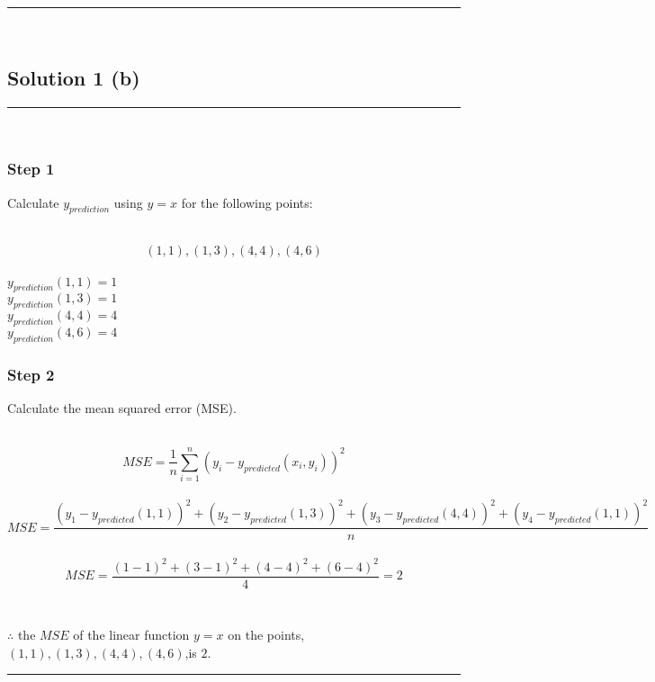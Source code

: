 \documentclass{article}
\begin{document}
\noindent\rule{\textwidth}{0.4pt}\\

\newpage

\subsection*{Solution 1 (b)}
\noindent\rule{\textwidth}{0.4pt}\\

\subsubsection*{Step 1}
\parbox{\textwidth}{
Calculate $y_{prediction}$ using $y = x$ for the following points:
}\\

$$(1,1), (1,3), (4,4), (4,6)$$\\

$y_{prediction}(1,1) = 1$\\

$y_{prediction}(1,3) = 1$\\

$y_{prediction}(4,4) = 4$\\

$y_{prediction}(4,6) = 4$\\

\subsubsection*{Step 2}
\parbox{\textwidth}{
Calculate the mean squared error (MSE).
}\\

$$MSE = \frac{1}{n} \sum_{i=1}^{n} (y_i-y_{predicted}(x_i,y_i))^2$$\\

$$MSE = \frac{(y_1-y_{predicted}(1,1))^2+(y_2-y_{predicted}(1,3))^2+(y_3-y_{predicted}(4,4))^2+(y_4-y_{predicted}(1,1))^2}{n}$$\\

$$MSE =\frac{(1-1)^2 + (3-1)^2 + (4-4)^2 + (6-4)^2}{4}=2$$\\

\subsubsection*{\normalfont}{$\therefore$ the $MSE$ of the linear function $y = x$ on the points, $(1,1), (1,3), (4,4), (4,6)$,is $2$.} \\

\noindent\rule{\textwidth}{0.4pt}\\
\end{document}
